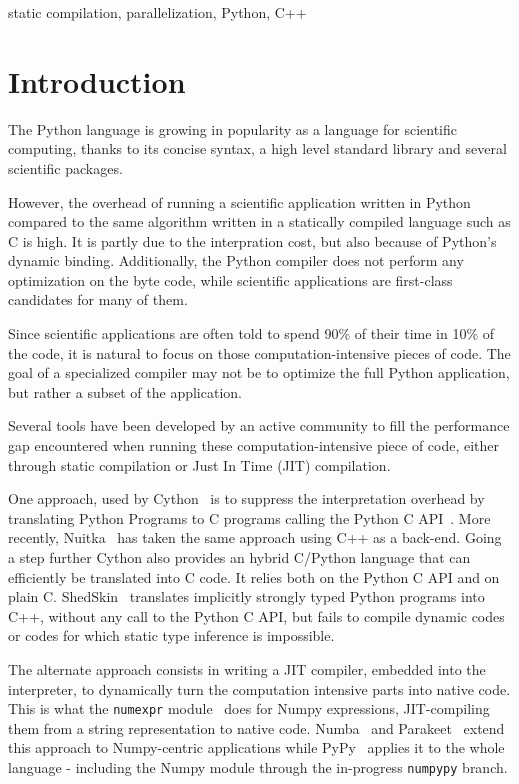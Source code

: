 \documentclass[10pt, onecolumn, preprint]{sigplanconf}
\begin{document}
\keywords
static compilation, parallelization, Python, C++


\section{Introduction}

The Python language is growing in popularity as a language for scientific
computing, thanks to %
 its concise syntax, a high level standard library and
several scientific packages.

However, the overhead of running a scientific application written in Python
compared to the same algorithm written in a statically compiled language such
as C is high. %
It is partly due to the interpration cost,
but also because of Python's dynamic binding. Additionally, the Python compiler does
not perform any optimization on the byte code, while scientific applications
are first-class candidates for many of them.

Since scientific applications are often told to spend 90\% of their time in
10\% of the code, it is natural to focus on those computation-intensive pieces 
of code. The goal of a specialized compiler %
may not be to optimize the full Python application, but rather a subset of the application.

Several tools have been developed by an active community to fill the performance
gap encountered when running these computation-intensive piece of code, either
through static compilation or Just In Time (JIT) compilation.

One approach, used by Cython~\cite{cython2010} is to suppress the interpretation
overhead by translating Python Programs to C programs calling the Python C
API~\cite{pythoncapi}. More recently, Nuitka~\cite{nuitka}  has taken the same
approach using C++ as a back-end. Going a step further Cython also provides an
hybrid C/Python language that can efficiently be translated into C code. It 
relies both on the Python C API and on plain C.
ShedSkin~\cite{shedskin2006} translates implicitly strongly typed Python programs
into C++, without any call to the Python C API, but fails to compile dynamic
codes or codes for which static type inference is impossible.

The alternate approach consists in writing a JIT compiler, embedded into the
interpreter, to dynamically turn the computation intensive parts into native
code. This is what the \texttt{numexpr} module~\cite{numexpr} does for Numpy 
expressions, JIT-compiling them from a string representation to native code.
Numba~\cite{numba} and Parakeet~\cite{parakeet2012} extend this approach to
Numpy-centric applications while PyPy~\cite{pypy2009} applies it to the whole
language - including the Numpy module through the in-progress \texttt{numpypy}
branch.
\end{document}
